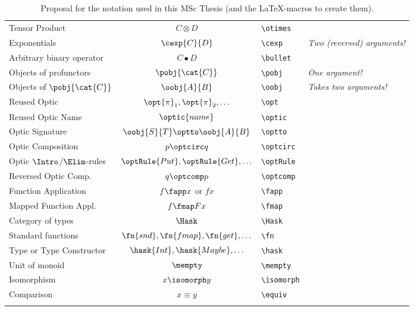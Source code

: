 \documentclass{standalone}
\begin{document}
\begin{longtable}[c]{lcll}
  Tensor Product & $C \otimes D$ & \verb|\otimes| \\
  Exponentials & $\cexp{C}{D}$ & \verb|\cexp| & \emph{Two (reversed) arguments!} \\
  Arbitrary binary operator & $C \bullet D$ & \verb|\bullet| \\
  \hline
  Objects of profunctors & $\pobj{\cat{C}}$ & \verb|\pobj| & \emph{One argument!} \\
  Objects of $\pobj{\cat{C}}$ & $\oobj{A}{B}$ & \verb|\oobj| & \emph{Takes two arguments!} \\
  \hline
  Reused Optic & $\opt{\pi}_1, \opt{\pi}_2, \ldots$ & \verb|\opt| \\
  Reused Optic Name & $\optic{name}$ & \verb|\optic| \\
  Optic Signature & $\oobj{S}{T} \optto \oobj{A}{B}$ &  \verb|\optto| \\
  Optic Composition & $p \optcirc q$ &  \verb|\optcirc| \\
  Optic $\Intro$/$\Elim$-rules & $\optRule{Put}, \optRule{Get}, \ldots$ & \verb|\optRule| \\
  Reversed Optic Comp. & $q \optcomp p$ & \verb|\optcomp| \\
  \hline
  Function Application & $f \fapp x$ or $f x$ & \verb|\fapp| \\
  Mapped Function Appl. & $f \fmap F x$ & \verb|\fmap| \\
  Category of types & $\Hask$ & \verb|\Hask| \\
  Standard functions & $\fn{snd}, \fn{fmap}, \fn{get}, \ldots$ & \verb|\fn| \\
  Type or Type Constructor & $\hask{Int}, \hask{Maybe}, \ldots$ & \verb|\hask| \\
  Unit of monoid & $\mempty$ & \verb|\mempty| \\
  \hline
  Isomorphism & $x \isomorph y$ & \verb|\isomorph| \\
  Comparison & $x \equiv y$ & \verb|\equiv| \\

  \caption{Proposal for the notation used in this MSc Thesis (and the \LaTeX-macros to create them).}%
\end{longtable}
\end{document}
